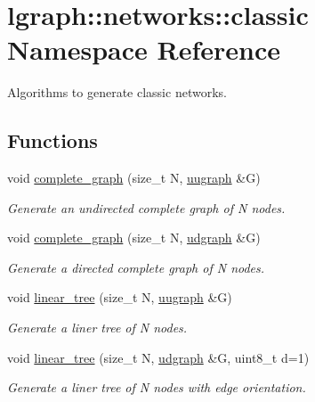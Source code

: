 \hypertarget{namespacelgraph_1_1networks_1_1classic}{}\section{lgraph\+:\+:networks\+:\+:classic Namespace Reference}
\label{namespacelgraph_1_1networks_1_1classic}


Algorithms to generate classic networks.  


\subsection*{Functions}
\begin{DoxyCompactItemize}
\item 
void \hyperlink{namespacelgraph_1_1networks_1_1classic_a1e4b680e58568ec361b80de0b06c07f1}{complete\+\_\+graph} (size\+\_\+t N, \hyperlink{classlgraph_1_1uugraph}{uugraph} \&G)
\begin{DoxyCompactList}\small\item\em Generate an undirected complete graph of {\itshape N} nodes. \end{DoxyCompactList}\item 
void \hyperlink{namespacelgraph_1_1networks_1_1classic_ad5c4b95c958be073656dc61776313919}{complete\+\_\+graph} (size\+\_\+t N, \hyperlink{classlgraph_1_1udgraph}{udgraph} \&G)
\begin{DoxyCompactList}\small\item\em Generate a directed complete graph of {\itshape N} nodes. \end{DoxyCompactList}\item 
void \hyperlink{namespacelgraph_1_1networks_1_1classic_a0f97ac0554fd9bd03e7618d857f136de}{linear\+\_\+tree} (size\+\_\+t N, \hyperlink{classlgraph_1_1uugraph}{uugraph} \&G)
\begin{DoxyCompactList}\small\item\em Generate a liner tree of {\itshape N} nodes. \end{DoxyCompactList}\item 
void \hyperlink{namespacelgraph_1_1networks_1_1classic_a207a73a90be34953bbffce096fd09ad6}{linear\+\_\+tree} (size\+\_\+t N, \hyperlink{classlgraph_1_1udgraph}{udgraph} \&G, uint8\+\_\+t d=1)
\begin{DoxyCompactList}\small\item\em Generate a liner tree of {\itshape N} nodes with edge orientation. \end{DoxyCompactList}\item 

\end{DoxyCompactItemize}
